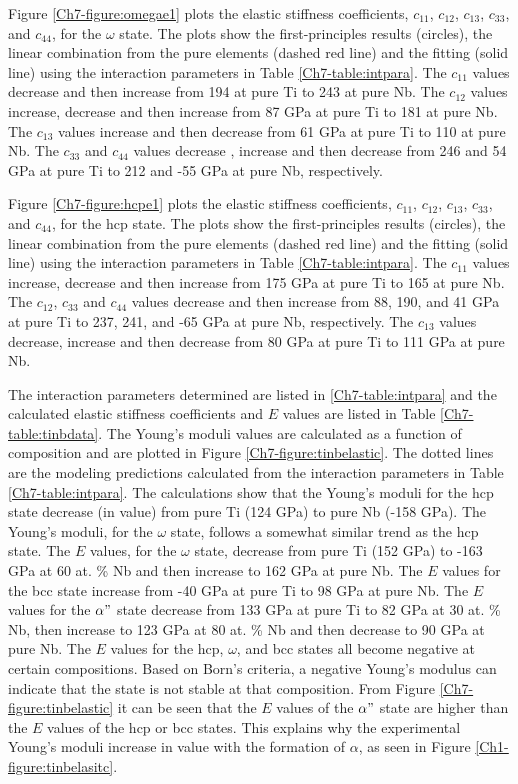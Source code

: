 Figure \ref{Ch7-figure:omegae1} plots the elastic stiffness coefficients, $c_{11}$, $c_{12}$, $c_{13}$, $c_{33}$, and $c_{44}$, for the $\omega$ state. The plots show the first-principles results (circles), the linear combination from the pure elements (dashed red line) and the fitting (solid line) using the interaction parameters in Table \ref{Ch7-table:intpara}. The $c_{11}$ values decrease and then increase from 194 at pure Ti to 243 at pure Nb. The $c_{12}$ values increase, decrease and then increase from 87 GPa at pure Ti to 181 at pure Nb. The $c_{13}$ values increase and then decrease from 61 GPa at pure Ti to 110 at pure Nb. The $c_{33}$ and $c_{44}$ values decrease , increase and then decrease from 246 and 54 GPa at pure Ti to 212 and -55 GPa at pure Nb, respectively.

Figure \ref{Ch7-figure:hcpe1} plots the elastic stiffness coefficients, $c_{11}$, $c_{12}$, $c_{13}$, $c_{33}$, and $c_{44}$, for the hcp state. The plots show the first-principles results (circles), the linear combination from the pure elements (dashed red line) and the fitting (solid line) using the interaction parameters in Table \ref{Ch7-table:intpara}. The $c_{11}$ values increase, decrease and then increase from 175 GPa at pure Ti to 165 at pure Nb. The $c_{12}$, $c_{33}$ and $c_{44}$ values decrease and then increase from 88, 190, and 41 GPa at pure Ti to 237, 241, and -65 GPa at pure Nb, respectively. The $c_{13}$ values decrease, increase and then decrease from 80 GPa at pure Ti to 111 GPa at pure Nb.

The interaction parameters determined are listed in \ref{Ch7-table:intpara} and the calculated elastic stiffness coefficients and $E$ values are listed in Table \ref{Ch7-table:tinbdata}. The Young's moduli values are calculated as a function of composition and are plotted in Figure \ref{Ch7-figure:tinbelastic}. The dotted lines are the modeling predictions calculated from the interaction parameters in Table \ref{Ch7-table:intpara}. The calculations show that the Young's moduli for the hcp state decrease (in value) from pure Ti (124 GPa) to pure Nb (-158 GPa). The Young's moduli, for the $\omega$ state, follows a somewhat similar trend as the hcp state. The $E$ values, for the $\omega$ state, decrease from pure Ti (152 GPa) to -163 GPa at 60 at. \% Nb and then increase to 162 GPa at pure Nb. The $E$ values for the bcc state increase from -40 GPa at pure Ti to 98 GPa at pure Nb. The $E$ values for the $\alpha"$ state decrease from 133 GPa at pure Ti to 82 GPa at 30 at. \% Nb, then increase to 123 GPa at 80 at. \% Nb and then decrease to 90 GPa at pure Nb. The $E$ values for the hcp, $\omega$, and bcc states all become negative at certain compositions. Based on Born's criteria, a negative Young's modulus can indicate that the state is not stable at that composition. From Figure \ref{Ch7-figure:tinbelastic} it can be seen that the $E$ values of the $\alpha"$ state are higher than the $E$ values of the hcp or bcc states. This explains why the experimental Young's moduli increase in value with the formation of $\alpha$, as seen in Figure \ref{Ch1-figure:tinbelasitc}. 

